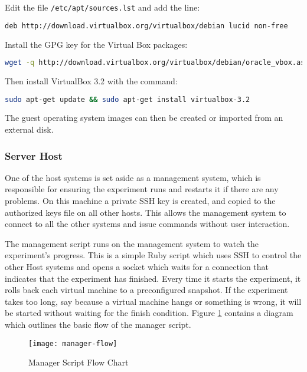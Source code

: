 \begin{enumerate*}
  \item Edit the file \verb+/etc/apt/sources.lst+ and add the line:
\begin{lstlisting}[language=sh]
deb http://download.virtualbox.org/virtualbox/debian lucid non-free
\end{lstlisting}
  \item Install the GPG key for the Virtual Box packages:
\begin{lstlisting}[language=sh]
wget -q http://download.virtualbox.org/virtualbox/debian/oracle_vbox.asc -O- | sudo apt-key add -
\end{lstlisting}
  \item Then install VirtualBox 3.2 with the command:
\begin{lstlisting}[language=sh]
sudo apt-get update && sudo apt-get install virtualbox-3.2
\end{lstlisting}
\end{enumerate*}

The guest operating system images can then be created or imported from an
external disk.

\subsubsection{Server Host}

One of the host systems is set aside as a management system, which is
responsible for ensuring the experiment runs and restarts it if there are any
problems. On this machine a private SSH key is created, and copied to the
authorized keys file on all other hosts. This allows the management system to
connect to all the other systems and issue commands without user interaction.

The management script runs on the management system to watch the experiment's
progress. This is a simple Ruby script which uses SSH to control the other Host
systems and opens a socket which waits for a connection that indicates that the
experiment has finished. Every time it starts the experiment, it rolls back
each virtual machine to a preconfigured snapshot. If the experiment takes too
long, say because a virtual machine hangs or something is wrong, it will be
started without waiting for the finish condition. Figure
\ref{manager-flow-diagram} contains a diagram which outlines the basic flow of
the manager script.

\begin{figure}[H]
  \centering\texttt{[image: manager-flow]}
  \caption{Manager Script Flow Chart}
  \label{manager-flow-diagram}
\end{figure}

